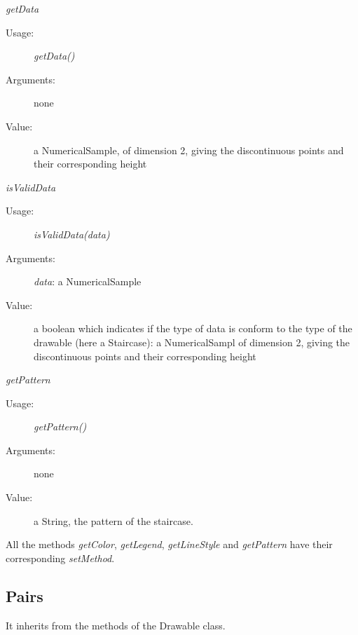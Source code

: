 \begin{description}
\begin{description}
  \item \textit{getData}
    \begin{description}
    \item[Usage:] \textit{getData()}
    \item[Arguments:] none
    \item[Value:] a NumericalSample, of dimension 2, giving the discontinuous points and their corresponding height
    \end{description}
    \bigskip
  \item \textit{isValidData}
    \begin{description}
    \item[Usage:] \textit{isValidData(data)}
    \item[Arguments:] \textit{data}: a NumericalSample
    \item[Value:] a boolean which indicates if the type of data is conform to the type of the drawable (here a Staircase): a NumericalSampl of dimension 2, giving the discontinuous points and their corresponding height
    \end{description}
    \bigskip
  \item \textit{getPattern}
    \begin{description}
    \item[Usage:] \textit{getPattern()}
    \item[Arguments:] none
    \item[Value:] a String, the pattern of the staircase.
    \end{description}
  \end{description}

  All the methods \textit{getColor},  \textit{getLegend},  \textit{getLineStyle}  and \textit{getPattern} have their corresponding \textit{setMethod}.

\end{description}




\newpage
\subsection{Pairs}


It inherits from the methods of the Drawable class.

